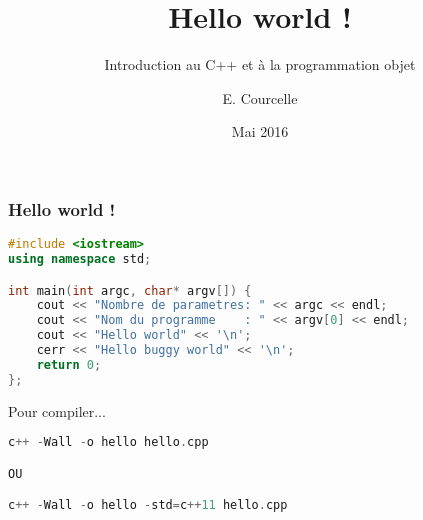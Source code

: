 \documentclass{beamer}
\title{Hello world !}
\subtitle{Introduction au C++ et à la programmation objet}
\author{E. Courcelle}\institute{CALMIP, UMS 3669}
\date{Mai 2016}
\begin{document}
\begin{frame}
\titlepage
\end{frame}

\begin{frame}[fragile=singleslide,shrink=20]
\frametitle {Hello world !}
\begin{lstlisting}[language=c++]
#include <iostream>
using namespace std;

int main(int argc, char* argv[]) {
    cout << "Nombre de parametres: " << argc << endl;
    cout << "Nom du programme    : " << argv[0] << endl;
    cout << "Hello world" << '\n';
    cerr << "Hello buggy world" << '\n';
    return 0;
};
\end{lstlisting}

\begin{block}{Pour compiler...}
\begin{lstlisting}[language=c++]
c++ -Wall -o hello hello.cpp

OU

c++ -Wall -o hello -std=c++11 hello.cpp
\end{lstlisting}
\end{block}
\end{frame}
\end{document}
